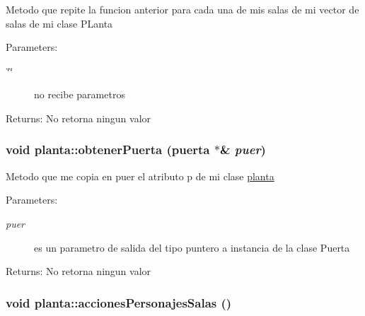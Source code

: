 Metodo que repite la funcion anterior para cada una de mis salas de mi vector de salas de mi clase PLanta \begin{Desc}
\item[Parameters:]
\begin{description}
\item[{\em \char`\"{}\char`\"{}}]no recibe parametros \end{description}
\end{Desc}
\begin{Desc}
\item[Returns:]No retorna ningun valor \end{Desc}
\hypertarget{classplanta_d66544ed0d0c8f20a98d7c8ce401a43f}{
\subsubsection[obtenerPuerta]{\setlength{\rightskip}{0pt plus 5cm}void planta::obtenerPuerta ({\bf puerta} $\ast$\& {\em puer})}}
\label{classplanta_d66544ed0d0c8f20a98d7c8ce401a43f}


Metodo que me copia en puer el atributo p de mi clase \hyperlink{classplanta}{planta} \begin{Desc}
\item[Parameters:]
\begin{description}
\item[{\em puer}]es un parametro de salida del tipo puntero a instancia de la clase Puerta \end{description}
\end{Desc}
\begin{Desc}
\item[Returns:]No retorna ningun valor \end{Desc}
\hypertarget{classplanta_015d9890a348a62c9680edaec54c3975}{
\subsubsection[accionesPersonajesSalas]{\setlength{\rightskip}{0pt plus 5cm}void planta::accionesPersonajesSalas ()}}
\label{classplanta_015d9890a348a62c9680edaec54c3975}


